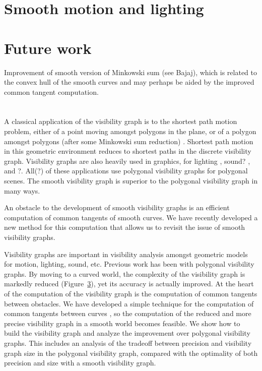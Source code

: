 \documentclass[11pt,twocolumn]{article}
\begin{document}
\section{Smooth motion and lighting}
\label{sec:application}

\section{Future work}

Improvement of smooth version of Minkowski sum (see Bajaj),
which is related to the convex hull of the smooth curves and may perhaps
be aided by the improved common tangent computation.

\section{}

A classical application of the visibility graph is 
to the shortest path motion problem,
either of a point moving amongst polygons in the plane, or of a polygon
amongst polygons (after some Minkowski sum reduction)
\cite{lozanoperez1and2}.
Shortest path motion in this geometric environment reduces to
shortest paths in the discrete visibility graph.
Visibility graphs are also heavily used in graphics, 
for lighting \cite{durand}, sound? \cite{?}, and ?.
All(?) of these applications use polygonal visibility graphs for polygonal scenes.
The smooth visibility graph is superior to the polygonal visibility
graph in many ways.

An obstacle to the development of smooth visibility graphs is an efficient
computation of common tangents of smooth curves.
We have recently developed a new method for this computation that allows
us to revisit the issue of smooth visibility graphs.

Visibility graphs are important in visibility analysis amongst geometric
models for motion, lighting, sound, etc.
Previous work has been with polygonal visibility graphs.
By moving to a curved world, the complexity of the visibility graph is markedly
reduced (Figure~\ref{}), yet its accuracy is actually improved.
At the heart of the computation of the visibility graph is the computation
of common tangents between obstacles.
We have developed a simple technique for the computation of common tangents
between curves \cite{jjCommonTang, jjPole},
so the computation of the reduced and more precise visibility graph 
in a smooth world becomes feasible.
We show how to build the visibility graph and analyze the improvement over
polygonal visibility graphs.
This includes an analysis of the tradeoff between precision and visibility
graph size in the polygonal visibility graph, compared with the optimality of both
precision and size with a smooth visibility graph.
\end{document}
